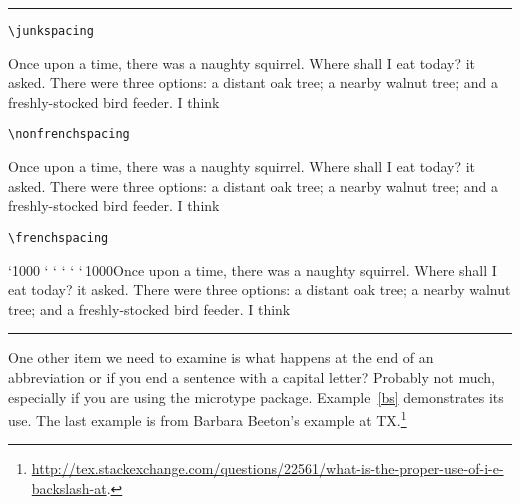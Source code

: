 \def\frenchspacing{\sfcode`\.1000 \sfcode`\?1000 \sfcode`\!1000
   \sfcode`\:1000 \sfcode`\;1000 \sfcode`\,1000}


 \let\tstory\frogking

\bigskip

\noindent\rule{\linewidth}{0.4pt}

\medskip
\narrower
{\hfill\hfill\small \texttt{\textbackslash junkspacing}}
\medskip


 \junkspacing Once upon a time, there was a naughty squirrel. Where shall I eat
     today? it asked. There were three options: a distant oak tree; a nearby 
    walnut tree; and a freshly-stocked bird feeder. I think\par

\bigskip

\smallskip
{\hfill\hfill\small \texttt{\textbackslash nonfrenchspacing}}

\medskip
\raggedright
     \nonfrenchspacing Once upon a time, there was a naughty squirrel. Where shall I eat
     today? it asked. There were three options: a distant oak tree; a nearby 
    walnut tree; and a freshly-stocked bird feeder. I think\par \par

\bigskip

\smallskip
{\hfill\hfill\noindent\small \texttt{\textbackslash frenchspacing}}

\medskip
     \frenchspacing Once upon a time, there was a naughty squirrel. Where shall I eat
     today? it asked. There were three options: a distant oak tree; a nearby 
    walnut tree; and a freshly-stocked bird feeder. I think\par \par

\medskip
\noindent\rule{\linewidth}{0.4pt}
\endgroup


One other item we need to examine is what happens at the end of an abbreviation or if you end a sentence with a capital letter? Probably not much, especially if you are using the microtype package. Example~\ref{bs} demonstrates its use. The last example is from Barbara Beeton's example at TX.\footnote{\url{http://tex.stackexchange.com/questions/22561/what-is-the-proper-use-of-i-e-backslash-at}.}

%
%
%

